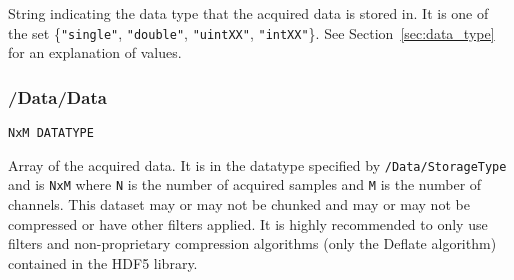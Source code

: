 \documentclass[12pt]{article} %
\begin{document}
String  indicating the data type that the acquired data is stored in.
It is one of the set \{\verb|"single"|, \verb|"double"|, \verb|"uintXX"|, \verb|"intXX"|\}.
See Section~\ref{sec:data_type} for an explanation of values.



\subsubsection{/Data/Data} \label{sec:data_data} 

\verb|NxM DATATYPE|

Array of the acquired data.
It is in the datatype specified by \verb|/Data/StorageType| and is \verb|NxM| where \verb|N| is the number of acquired samples and \verb|M| is the number of channels.
This dataset may or may not be chunked and may or may not be compressed or have other filters applied.
It is highly recommended to only use filters and non-proprietary compression algorithms (only the Deflate algorithm) contained in the HDF5 library.
\end{document}
